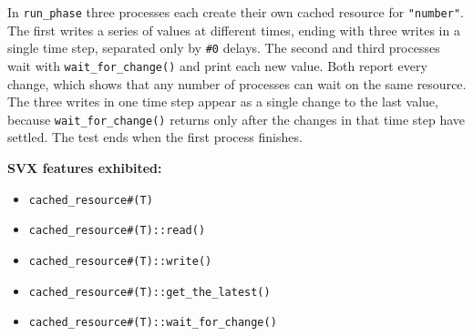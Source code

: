 \documentclass[11pt,letterpaper]{report}
\begin{document}
In \texttt{run\_phase} three processes each create their own cached resource for \texttt{"number"}. The first writes a series of values at different times, ending with three writes in a single time step, separated only by \texttt{\#0} delays. The second and third processes wait with \texttt{wait\_for\_change()} and print each new value. Both report every change, which shows that any number of processes can wait on the same resource. The three writes in one time step appear as a single change to the last value, because \texttt{wait\_for\_change()} returns only after the changes in that time step have settled. The test ends when the first process finishes.

\textbf{SVX features exhibited:}

\begin{itemize}
  \item \texttt{cached\_resource\#(T)}
  \item \texttt{cached\_resource\#(T)::read()}
  \item \texttt{cached\_resource\#(T)::write()}
  \item \texttt{cached\_resource\#(T)::get\_the\_latest()}
  \item \texttt{cached\_resource\#(T)::wait\_for\_change()}
\end{itemize}
\end{document}
